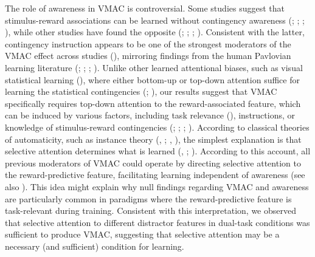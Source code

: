 \documentclass[
  man,
  floatsintext,
  longtable,
  nolmodern,
  notxfonts,
  notimes,
  colorlinks=true,linkcolor=blue,citecolor=blue,urlcolor=blue]{apa7}
\begin{document}
The role of awareness in VMAC is controversial. Some studies suggest
that stimulus-reward associations can be learned without contingency
awareness (;
;
;
), while other
studies have found the opposite (; ; ; ). Consistent with
the latter, contingency instruction appears to be one of the strongest
moderators of the VMAC effect across studies
(), mirroring findings from the human Pavlovian learning literature
(;
;
;
). Unlike other
learned attentional biases, such as visual statistical learning
(), where either
bottom-up or top-down attention suffice for learning the statistical
contingencies (;
), our results
suggest that VMAC specifically requires top-down attention to the
reward-associated feature, which can be induced by various factors,
including task relevance (), instructions, or knowledge of stimulus-reward contingencies
(;
;
;
). According to classical
theories of automaticity, such as instance theory
(,
; , ), the simplest explanation is that
selective attention determines what is learned
(,
; ). According to this account, all previous moderators of
VMAC could operate by directing selective attention to the
reward-predictive feature, facilitating learning independent of
awareness (see also ). This idea might explain why null findings regarding VMAC and
awareness are particularly common in paradigms where the
reward-predictive feature is task-relevant during training. Consistent
with this interpretation, we observed that selective attention to
different distractor features in dual-task conditions was sufficient to
produce VMAC, suggesting that selective attention may be a necessary
(and sufficient) condition for learning.
\end{document}
